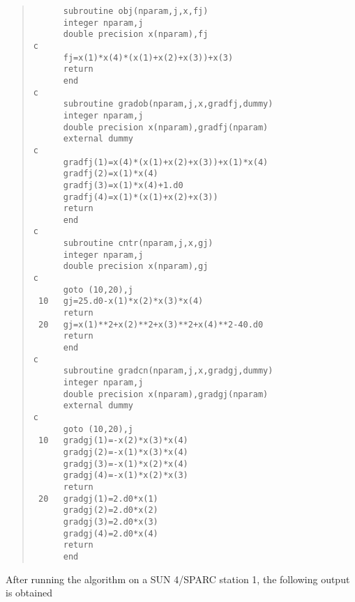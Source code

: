 \begin{quote}
\begin{verbatim}
      subroutine obj(nparam,j,x,fj)
      integer nparam,j
      double precision x(nparam),fj
c
      fj=x(1)*x(4)*(x(1)+x(2)+x(3))+x(3)
      return
      end
c     
      subroutine gradob(nparam,j,x,gradfj,dummy)
      integer nparam,j
      double precision x(nparam),gradfj(nparam)
      external dummy
c  
      gradfj(1)=x(4)*(x(1)+x(2)+x(3))+x(1)*x(4)
      gradfj(2)=x(1)*x(4)
      gradfj(3)=x(1)*x(4)+1.d0
      gradfj(4)=x(1)*(x(1)+x(2)+x(3))
      return
      end
c     
      subroutine cntr(nparam,j,x,gj)
      integer nparam,j
      double precision x(nparam),gj
c
      goto (10,20),j
 10   gj=25.d0-x(1)*x(2)*x(3)*x(4)
      return
 20   gj=x(1)**2+x(2)**2+x(3)**2+x(4)**2-40.d0
      return
      end
c
      subroutine gradcn(nparam,j,x,gradgj,dummy)
      integer nparam,j
      double precision x(nparam),gradgj(nparam)
      external dummy
c
      goto (10,20),j
 10   gradgj(1)=-x(2)*x(3)*x(4)
      gradgj(2)=-x(1)*x(3)*x(4)
      gradgj(3)=-x(1)*x(2)*x(4)
      gradgj(4)=-x(1)*x(2)*x(3)
      return
 20   gradgj(1)=2.d0*x(1)
      gradgj(2)=2.d0*x(2)
      gradgj(3)=2.d0*x(3)
      gradgj(4)=2.d0*x(4)
      return
      end
\end{verbatim}
\end{quote}
After running the algorithm on a SUN 4/SPARC station 1, the following
output is obtained
